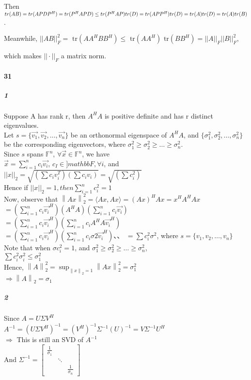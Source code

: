 \documentclass[10pt,letter]{article}
\newcommand\norm[1]{\left\lVert#1\right\rVert}
\begin{document}
Then $tr(AB) = tr (APDP^{H}) = tr(P^{H}APD) \leq tr(P^{H}AP)tr(D) \\ = tr(APP^{H})tr(D) = tr(A)tr(D) = tr(A)tr(B)$.

Meanwhile,
$||AB||_F^2 = \text{ tr}(AA^HBB^H) \leq \text{ tr}(AA^H) \text{ tr}(BB^H) = ||A||_F ||B||_F^2 $,

which makes $|| \cdot ||_F$ a matrix norm.
\paragraph{31}
\subparagraph{1}
Suppose A has rank r, then $A^HA$ is positive definite and has r distinct eigenvalues. \\
Let $s=\{\vec{v_1},\vec{v_2},\dots,\vec{v_n} \}$ be an orthonormal eigenspace of $A^HA$, and $\{\sigma_1^2,\sigma_2^2,\dots,\sigma_n^2 \}$ be the corresponding eigenvectors, where $\sigma_1^2\geq\sigma_2^2\geq\dots\geq\sigma_n^2$.\\
Since $s$ spans $\mathbb{F}^n$, $\forall \vec{x}\in \mathbb{F}^n$, we have \\
$\vec{x}=\sum_{i=1}^nc_i\vec{v_i}$,  $c_I\in]mathbb{F}, \forall i$, and \\
$||x||_2=\sqrt{(\sum c_iv_i^T)(\sum c_iv_i)}=\sqrt{(\sum c_i^2)}$ \\
Hence if $||x||_2=1, then \sum_{i=1}^n c_i^2=1$\\
Now, observe that $\norm{Ax}_2^2=\langle Ax,Ax \rangle=(Ax)^HAx=x^HA^HAx$\\
$=(\sum_{i=1}^nc_i\vec{v_i}^H)(A^HA)(\sum_{i=1}^nc_i\vec{v_i})$\\
$=(\sum_{i=1}^nc_i\vec{v_i}^H)(\sum_{i=1}^nc_iA^HA\vec{v_i}^H)$\\
$=(\sum_{i=1}^nc_i\vec{v_i}^H)(\sum_{i=1}^nc_i\sigma2\vec{v_i}^H)$、、
$=\sum c_i^2\sigma^2$, where $s=\{v_1,v_2,\dots,v_n \}$\\
Note that when $\sigma c_i^2=1$, and $\sigma_1^2\geq\sigma_2^2\geq\dots\geq\sigma_n^2$,\\
$\sum c_i^2\sigma_i^2\leq \sigma_1^2$\\
Hence, $\norm{A}_2^2=\sup_{\norm{x}_2=1}\norm{Ax}_2^2=\sigma_1^2$\\
$\Rightarrow \norm{A}_2=\sigma_1$
\subparagraph{2}
Since $A=U\Sigma V^H$\\
$A^{-1}=(U\Sigma V^H)^{-1}=(V^H)^{-1}\Sigma^{-1}(U)^{-1}=V\Sigma^{-1}U^H$\\
$\Rightarrow $ This is still an SVD of $A^{-1}$\\
And $\Sigma^{-1}=\begin{bmatrix}
\frac{1}{\sigma_1}&&\\
&\ddots&\\
&&\frac{1}{\sigma_n}
\end{bmatrix}$\\
\end{document}
